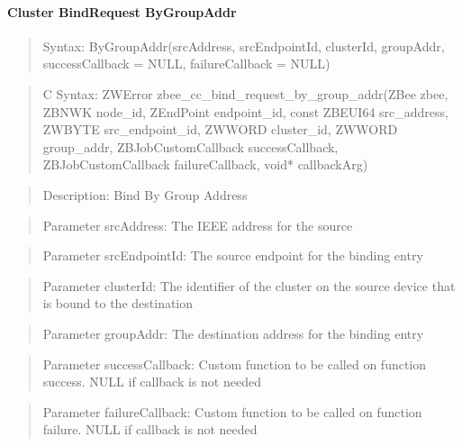 \paragraph{Cluster BindRequest ByGroupAddr}
\begin{quote}Syntax: ByGroupAddr(srcAddress, srcEndpointId, clusterId, groupAddr, successCallback = NULL, failureCallback = NULL)\end{quote}
\begin{quote}C Syntax: ZWError zbee\_cc\_bind\_request\_by\_group\_addr(ZBee zbee, ZBNWK node\_id, ZEndPoint endpoint\_id, const ZBEUI64 src\_address, ZWBYTE src\_endpoint\_id, ZWWORD cluster\_id, ZWWORD group\_addr, ZBJobCustomCallback successCallback, ZBJobCustomCallback failureCallback, void* callbackArg)\end{quote}
\begin{quote}Description: Bind By Group Address\end{quote}
\begin{quote}Parameter srcAddress: The IEEE address for the source\end{quote}
\begin{quote}Parameter srcEndpointId: The source endpoint for the binding entry\end{quote}
\begin{quote}Parameter clusterId: The identifier of the cluster on the source device that is bound to the destination\end{quote}
\begin{quote}Parameter groupAddr: The destination address for the binding entry\end{quote}
\begin{quote}Parameter successCallback: Custom function to be called on function success. NULL if callback is not needed\end{quote}
\begin{quote}Parameter failureCallback: Custom function to be called on function failure. NULL if callback is not needed\end{quote}


